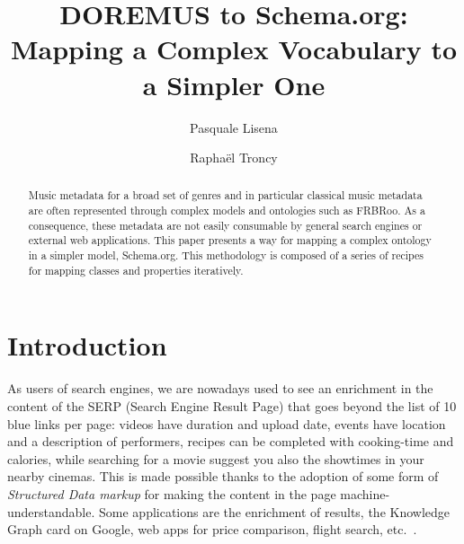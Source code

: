 \documentclass{llncs}
\begin{document}
\title{DOREMUS to Schema.org: Mapping a Complex Vocabulary to a Simpler One}

\author{Pasquale Lisena \and Rapha\"el Troncy}

\maketitle


\begin{abstract}
Music metadata for a broad set of genres and in particular classical music metadata are often represented through complex models and ontologies such as FRBRoo. As a consequence, these metadata are not easily consumable by general search engines or external web applications. This paper presents a way for mapping a complex ontology in a simpler model, Schema.org. This methodology is composed of a series of recipes for mapping classes and properties iteratively.

\end{abstract}


\section{Introduction}
\label{sec:introduction}
As users of search engines, we are nowadays used to see an enrichment in the content of the SERP (Search Engine Result Page) that goes beyond the list of 10 blue links per page: videos have duration and upload date, events have location and a description of performers, recipes can be completed with cooking-time and calories, while searching for a movie suggest you also the showtimes in your nearby cinemas. This is made possible thanks to the adoption of some form of \textit{Structured Data markup} for making the content in the page machine-understandable. Some applications are the enrichment of results, the Knowledge Graph card on Google, web apps for price comparison, flight search, etc.~\cite{guha2015schema}.
\end{document}
